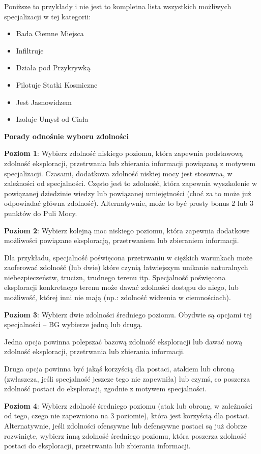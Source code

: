 Poniższe to przykłady i nie jest to kompletna lista wszystkich możliwych specjalizacji w tej kategorii:

\begin{itemize}
\item Bada Ciemne Miejsca
\item Infiltruje
\item Działa pod Przykrywką
\item Pilotuje Statki Kosmiczne
\item Jest Jasnowidzem
\item Izoluje Umysł od Ciała
\end{itemize}

\textbf{Porady odnośnie wyboru zdolności}

\textbf{Poziom 1}: Wybierz zdolność niskiego poziomu, która zapewnia podstawową zdolność eksploracji, przetrwania lub zbierania informacji powiązaną z motywem specjalizacji.
Czasami, dodatkowa zdolność niskiej mocy jest stosowna, w zależności od specjalności. Często jest to zdolność, która zapewnia wyszkolenie w powiązanej dziedzinie wiedzy lub powiązanej umiejętności (choć za to może już odpowiadać główna zdolność). Alternatywnie, może to być prosty bonus 2 lub 3 punktów do Puli Mocy.

\textbf{Poziom 2}: Wybierz kolejną moc niskiego poziomu, która zapewnia dodatkowe możliwości powiązane  eksploracją, przetrwaniem lub zbieraniem informacji. 

Dla przykładu, specjalność poświęcona przetrwaniu w ciężkich warunkach może zaoferować zdolność (lub dwie) które czynią łatwiejszym unikanie naturalnych niebezpieczeństw, trucizn, trudnego terenu itp. Specjalność poświęcona eksploracji konkretnego terenu może dawać zdolności dostępu do niego, lub możliwość, której inni nie mają (np.: zdolność widzenia w ciemnościach).

\textbf{Poziom 3}: Wybierz dwie zdolności średniego poziomu. Obydwie są opcjami tej specjalności – BG wybierze jedną lub drugą.

Jedna opcja powinna polepszać bazową zdolność eksploracji lub dawać nową zdolność eksploracji, przetrwania lub zbierania informacji.

Druga opcja powinna być jakąś korzyścią dla postaci, atakiem lub obroną (zwłaszcza, jeśli specjalność jeszcze tego nie zapewniła) lub czymś, co poszerza zdolność postaci do eksploracji, zgodnie z motywem specjalności. 

\textbf{Poziom 4}: Wybierz zdolność średniego poziomu (atak lub obronę, w zależności od tego, czego nie zapewniono na 3 poziomie), która jest korzyścią dla postaci. Alternatywnie, jeśli zdolności ofensywne lub defensywne postaci są już dobrze rozwinięte, wybierz inną zdolność średniego poziomu, która poszerza zdolność postaci do eksploracji, przetrwania lub zbierania informacji. 

